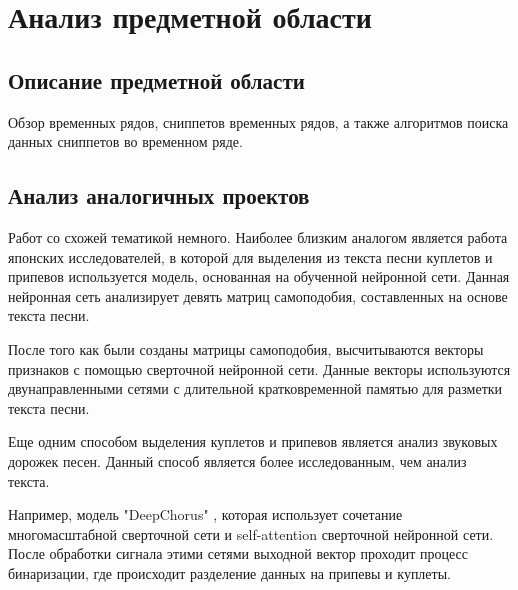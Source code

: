 \newpage
\section{Анализ предметной области}
\label{sec:Background}

\subsection{Описание предметной области}
Обзор временных рядов, сниппетов временных рядов, а также алгоритмов поиска данных сниппетов во временном ряде.
\vspace{2em}
\subsection{Анализ аналогичных проектов}
Работ со схожей тематикой немного. Наиболее близким аналогом является работа японских исследователей\cite{WatanabeG20}, в которой для выделения из текста песни куплетов и припевов используется модель, основанная на обученной нейронной сети. Данная нейронная сеть анализирует девять матриц самоподобия, составленных на основе текста песни.

После того как были созданы матрицы самоподобия, высчитываются векторы признаков с помощью сверточной нейронной сети. Данные векторы используются двунаправленными сетями с длительной кратковременной памятью для разметки текста песни.

Еще одним способом выделения куплетов и припевов является анализ звуковых дорожек песен. Данный способ является более исследованным, чем анализ текста.

Например, модель "DeepChorus" \cite{DeepChorus}, которая использует сочетание многомасштабной сверточной сети и self-attention сверточной нейронной сети. После обработки сигнала этими сетями выходной вектор проходит процесс бинаризации, где происходит разделение данных на припевы и куплеты.



